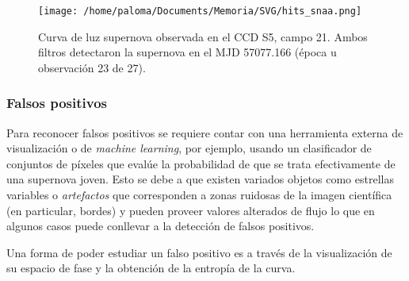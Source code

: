 \begin{figure}[h!]
\centering
\texttt{[image: /home/paloma/Documents/Memoria/SVG/hits\_snaa.png]}
\caption{Curva de luz supernova observada en el CCD S5, campo 21. Ambos filtros detectaron la supernova en el MJD 57077.166 (\'epoca u observaci\'on 23 de 27).}
\label{fig:orig_det_snaa}
\end{figure}
\bigskip

\subsubsection{Falsos positivos}
Para reconocer falsos positivos se requiere contar con una herramienta externa de visualizaci\'on o de \textit{machine learning}, por ejemplo, usando un clasificador de conjuntos de p\'ixeles que eval\'ue la probabilidad de que se trata efectivamente de una supernova joven. Esto se debe a que existen variados objetos como estrellas variables o \textit{artefactos} que corresponden a zonas ruidosas de la imagen  cient\'ifica (en particular, bordes) y pueden proveer valores alterados de flujo lo que en algunos casos puede conllevar a la detecci\'on de falsos positivos.
\bigskip

Una forma de poder estudiar un falso positivo es a trav\'es de la visualizaci\'on de su espacio de fase y la obtenci\'on de la entrop\'ia de la curva.